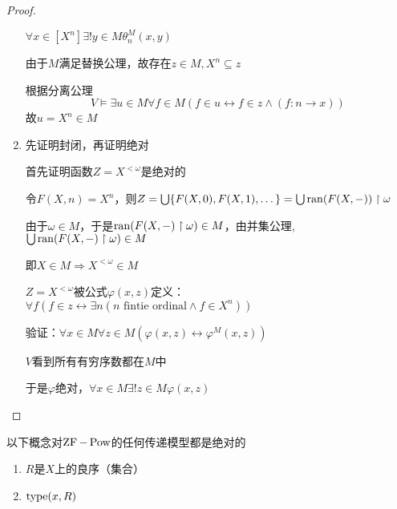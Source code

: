 \documentclass[11pt]{article}
\begin{document}
\begin{proof}
\begin{enumerate}
\(\forall x\in[X^n]\exists!y\in M\theta_n^M(x,y)\)

由于\(M\)满足替换公理，故存在\(z\in M, X^n\subseteq z\)

根据分离公理
\begin{equation*}
V\vDash\exists u\in M\forall f\in M(f\in u\leftrightarrow f\in z\wedge(f:n\to x))
\end{equation*}
故\(u=X^n\in M\)

\item 先证明封闭，再证明绝对

首先证明函数\(Z=X^{<\omega}\)是绝对的

令\(F(X,n)=X^n\)，则\(Z=\bigcup\{F(X,0),F(X,1),\dots\}=\bigcup\operatorname{ran}(F(X,-))\upharpoonright\omega\)

由于\(\omega\in M\)，于是\(\operatorname{ran}(F(X,-)\upharpoonright\omega)\in M\)，由并集公理,\(\bigcup\operatorname{ran}(F(X,-)\upharpoonright\omega)\in M\)

即\(X\in M\Rightarrow X^{<\omega}\in M\)

\(Z=X^{<\omega}\)被公式\(\varphi(x,z)\)定义：\(\forall f(f\in z\leftrightarrow\exists n(n\text{ fintie ordinal}\wedge f\in X^n))\)

验证：\(\forall x\in M\forall z\in M(\varphi(x,z)\leftrightarrow\varphi^M(x,z))\)

\(V\)看到所有有穷序数都在\(M\)中

于是\(\varphi\)绝对，\(\forall x\in M\exists!z\in M\varphi(x,z)\)
\end{enumerate}
\end{proof}

\begin{theorem}[]
以下概念对\(\operatorname{ZF}-\operatorname{Pow}\)的任何传递模型都是绝对的
\begin{enumerate}
\item \(R\)是\(X\)上的良序（集合）
\item \(\operatorname{type}(x,R)\)
\end{enumerate}
\end{theorem}
\end{document}
